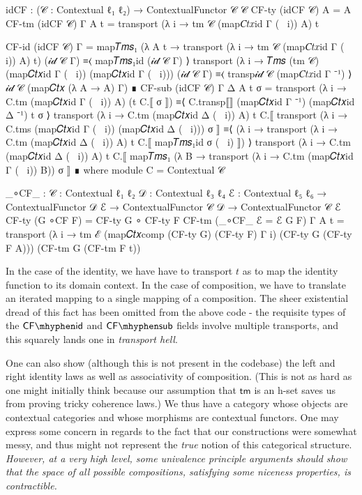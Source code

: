 \begin{AgdaMultiCode}
\begin{code}
idCF : (𝒞 : Contextual ℓ₁ ℓ₂) → ContextualFunctor 𝒞 𝒞
CF-ty (idCF 𝒞) A = A
CF-tm (idCF 𝒞) {Γ} {A} t = transport (λ i → tm 𝒞 (map𝐶𝑡𝑥id Γ (~ i)) A) t
\end{code}
\begin{code}[hide]
CF-id (idCF 𝒞) {Γ} =
  map𝑇𝑚𝑠₁ (λ {A} t → transport (λ i → tm 𝒞 (map𝐶𝑡𝑥id Γ (~ i)) A) t) (𝒾𝒹 𝒞 Γ)
    ≡⟨ map𝑇𝑚𝑠₁id (𝒾𝒹 𝒞 Γ) ⟩
  transport (λ i → 𝑇𝑚𝑠 (tm 𝒞) (map𝐶𝑡𝑥id Γ (~ i)) (map𝐶𝑡𝑥id Γ (~ i))) (𝒾𝒹 𝒞 Γ)
    ≡⟨ transp𝒾𝒹 𝒞 (map𝐶𝑡𝑥id Γ ⁻¹) ⟩
  𝒾𝒹 𝒞 (map𝐶𝑡𝑥 (λ A → A) Γ)
    ∎
CF-sub (idCF 𝒞) {Γ} {Δ} {A} t σ =
  transport (λ i → C.tm (map𝐶𝑡𝑥id Γ (~ i)) A) (t C.⟦ σ ⟧)
    ≡⟨ C.transp⟦⟧ (map𝐶𝑡𝑥id Γ ⁻¹) (map𝐶𝑡𝑥id Δ ⁻¹) t σ ⟩
  transport (λ i → C.tm (map𝐶𝑡𝑥id Δ (~ i)) A) t
    C.⟦ transport (λ i → C.tms (map𝐶𝑡𝑥id Γ (~ i)) (map𝐶𝑡𝑥id Δ (~ i))) σ ⟧
    ≡⟨ (λ i → transport (λ i → C.tm (map𝐶𝑡𝑥id Δ (~ i)) A) t C.⟦ map𝑇𝑚𝑠₁id σ (~ i) ⟧) ⟩
  transport (λ i → C.tm (map𝐶𝑡𝑥id Δ (~ i)) A) t
    C.⟦ map𝑇𝑚𝑠₁ (λ {B} → transport (λ i → C.tm (map𝐶𝑡𝑥id Γ (~ i)) B)) σ ⟧
    ∎ where
  module C = Contextual 𝒞
\end{code}
\begin{code}

_∘CF_ : {𝒞 : Contextual ℓ₁ ℓ₂} {𝒟 : Contextual ℓ₃ ℓ₄} {ℰ : Contextual ℓ₅ ℓ₆} →
  ContextualFunctor 𝒟 ℰ → ContextualFunctor 𝒞 𝒟 → ContextualFunctor 𝒞 ℰ
CF-ty (G ∘CF F) = CF-ty G ∘ CF-ty F
CF-tm (_∘CF_ {ℰ = ℰ} G F) {Γ} {A} t  =
  transport (λ i → tm ℰ (map𝐶𝑡𝑥comp (CF-ty G) (CF-ty F) Γ i) (CF-ty G (CF-ty F A)))
    (CF-tm G (CF-tm F t))
\end{code}
\end{AgdaMultiCode}

In the case of the identity, we have have to transport $t$ as to map the
identity function to its domain context. In the case of composition, we have to
translate an iterated mapping to a single mapping of a composition. The sheer
existential dread of this fact has been omitted from the above code - the
requisite types of the $\mathsf{CF\mhyphen id}$ and $\mathsf{CF\mhyphen sub}$
fields involve multiple transports, and this squarely lands one in
\emph{transport hell}.

One can also show (although this is not present in the codebase) the left and
right identity laws as well as associativity of composition. (This is not as
hard as one might initially think because our assumption that $\mathsf{tm}$ is
an h-set saves us from proving tricky coherence laws.) We thus have a category
whose objects are contextual categories and whose morphisms are contextual
functors. One may express some concern in regards to the fact that our
constructions were somewhat messy, and thus might not represent the \emph{true}
notion of this categorical structure. \emph{However, at a very high level, some
univalence principle arguments should show that the space of all possible
compositions, satisfying some niceness properties, is contractible.}

